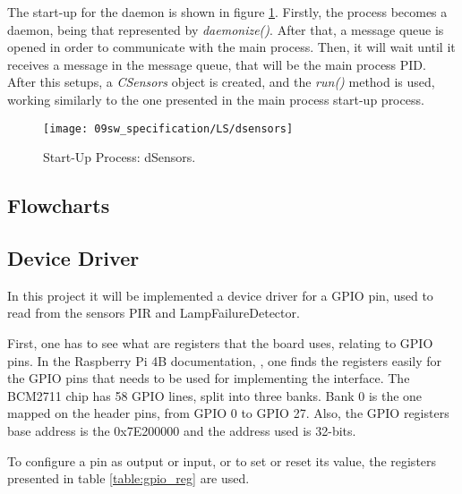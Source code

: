 \clearpage
{}

The start-up for the daemon is shown in figure \ref{fig:dsensors}. Firstly, the process becomes a daemon, being that represented by \textit{daemonize()}. After that, a message queue is opened in order to communicate with the main process. Then, it will wait until it receives a message in the message queue, that will be the main process PID. After this setups, a \textit{CSensors} object is created, and the \textit{run()} method is used, working similarly to the one presented in the main process start-up process.

\begin{figure}[H]
	\centering
	\texttt{[image: 09sw\_specification/LS/dsensors]}
	\caption{Start-Up Process: dSensors.}
	\label{fig:dsensors}
\end{figure}

\clearpage
\subsection{Flowcharts}


\clearpage
\subsection{Device Driver}
In this project it will be implemented a device driver for a GPIO pin, used to read from the sensors PIR and LampFailureDetector.

First, one has to see what are registers that the board uses, relating to GPIO pins. In the Raspberry Pi 4B documentation, \cite{rpi_datasheet}, one finds the registers easily for the GPIO pins that needs to be used for implementing the interface. The BCM2711 chip has 58 GPIO lines, split into three banks. Bank 0 is the one mapped on the header pins, from GPIO 0 to GPIO 27. Also, the GPIO registers base address is the 0x7E200000 and the address used is 32-bits.

To configure a pin as output or input, or to set or reset its value, the registers presented in table \ref{table:gpio_reg} are used.

